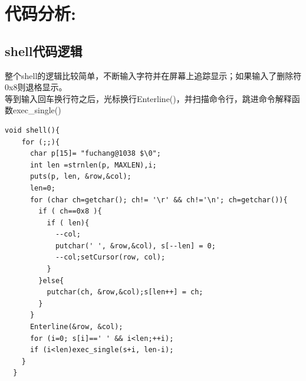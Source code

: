 \documentclass[a4paper,11pt,UTF8]{ctexart}
\begin{document}
\section{代码分析:}

      \subsection{shell代码逻辑}
      整个shell的逻辑比较简单，不断输入字符并在屏幕上追踪显示；如果输入了删除符0x8则退格显示。\\
      等到输入回车换行符之后，光标换行Enterline()，并扫描命令行，跳进命令解释函数exec\_single()

      \begin{lstlisting}[caption={shell函数},captionpos=b]
void shell(){
    for (;;){
      char p[15]= "fuchang@1038 $\0";
      int len =strnlen(p, MAXLEN),i;
      puts(p, len, &row,&col);
      len=0;
      for (char ch=getchar(); ch!= '\r' && ch!='\n'; ch=getchar()){
        if ( ch==0x8 ){
          if ( len){
            --col;
            putchar(' ', &row,&col), s[--len] = 0;
            --col;setCursor(row, col);
          }
        }else{
          putchar(ch, &row,&col);s[len++] = ch;
        }
      }
      Enterline(&row, &col);
      for (i=0; s[i]==' ' && i<len;++i);
      if (i<len)exec_single(s+i, len-i);
    }
  }
      \end{lstlisting}
\end{document}
